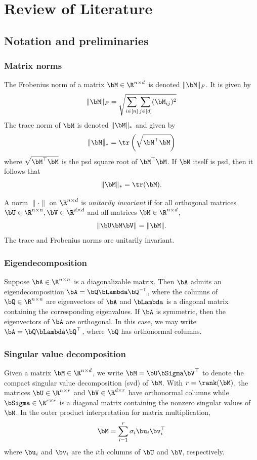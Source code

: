 \section{Review of Literature}
\label{sec:review}
\subsection{Notation and preliminaries}
\label{ssec:prelim}

\subsubsection{Matrix norms}
The Frobenius norm of a matrix $\bM\in\R^{n\times d}$ is denoted $\|\bM\|_F$. It is given by
\[\|\bM\|_F = \sqrt{\sum_{i\in [n]}\sum_{j\in [d]} (\bM_{ij})^2}\]
The trace norm of $\bM$ is denoted $\|\bM\|_\ast$ and given by
\[\|\bM\|_\ast  = \tr\left(\sqrt{\bM^\top\bM}\right)\]
where $\sqrt{\bM^\top\bM}$ is the psd square root of $\bM^\top\bM$. If $\bM$ itself is psd, then it follows that
\[\|\bM\|_\ast = \tr(\bM).\]
\begin{definition}
    A norm $\|\cdot\|$ on $\R^{n\times d}$ is \textit{unitarily invariant} if for all orthogonal matrices $\bU\in \R^{n\times n}, \bV\in \R^{d\times d}$ and all matrices $\bM\in\R^{n\times d}$,
    \[\|\bU\bM\bV\| = \|\bM\|.\]
    The trace and Frobenius norms are unitarily invariant.
\end{definition}

\subsubsection{Eigendecomposition} Suppose $\bA\in\R^{n\times n}$ is a diagonalizable matrix. Then $\bA$ admits an eigendecomposition $\bA = \bQ\bLambda\bQ^{-1}$, where the columns of $\bQ\in \R^{n\times n}$ are eigenvectors of $\bA$ and $\bLambda$ is a diagonal matrix containing the corresponding eigenvalues. If $\bA$ is symmetric, then the eigenvectors of $\bA$ are orthogonal. In this case, we may write $\bA = \bQ\bLambda\bQ^\top$, where $\bQ$ has orthonormal columns.

\subsubsection{Singular value decomposition}
Given a matrix $\bM\in\R^{n\times d}$, we write $\bM = \bU\bSigma\bV^\top$ to denote the compact singular value decomposition (svd) of $\bM$. With $r = \rank(\bM)$, the matrices $\bU\in\R^{n\times r}$ and $\bV\in\R^{d\times r}$ have orthonormal columns while $\bSigma\in\R^{r\times r}$ is a diagonal matrix containing the nonzero singular values of $\bM$. In the outer product interpretation for matrix multiplication,
\[\bM = \sum_{i=1}^r \sigma_i\bu_i\bv_i^\top\]
where $\bu_i$ and $\bv_i$ are the $i$th columns of $\bU$ and $\bV$, respectively.


